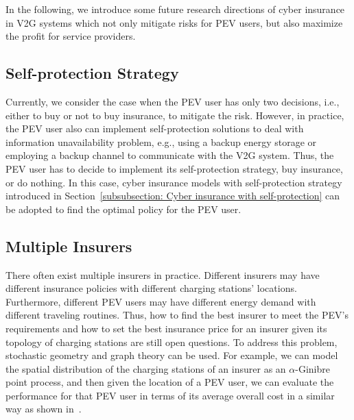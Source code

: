 \documentclass[twocolumn,10pt]{IEEEtran}
\begin{document}
In the following, we introduce some future research directions of cyber insurance in V2G systems which not only mitigate risks for PEV users, but also maximize the profit for service providers. 

\subsection{Self-protection Strategy}

Currently, we consider the case when the PEV user has only two decisions, i.e., either to buy or not to buy insurance, to mitigate the risk. However, in practice, the PEV user also can implement self-protection solutions to deal with information unavailability problem, e.g., using a backup energy storage or employing a backup channel to communicate with the V2G system. Thus, the PEV user has to decide to implement its self-protection strategy, buy insurance, or do nothing. In this case, cyber insurance models with self-protection strategy introduced in Section~\ref{subsubsection: Cyber insurance with self-protection} can be adopted to find the optimal policy for the PEV user. 


\subsection{Multiple Insurers}

There often exist multiple insurers in practice. Different insurers may have different insurance policies with different charging stations' locations. Furthermore, different PEV users may have different energy demand with different traveling routines. Thus, how to find the best insurer to meet the PEV's requirements and how to set the best insurance price for an insurer given its topology of charging stations are still open questions. To address this problem, stochastic geometry and graph theory can be used. For example, we can model the spatial distribution of the charging stations of an insurer as an $\alpha$-Ginibre point process, and then given the location of a PEV user, we can evaluate the performance for that PEV user in terms of its average overall cost in a similar way as shown in~\cite{Kong2016Extract}.


\end{document}
